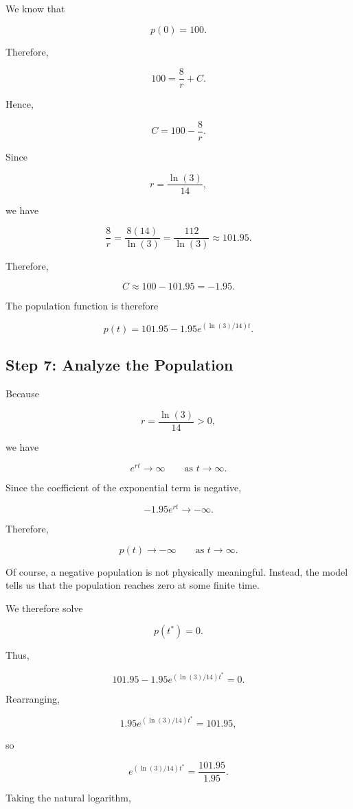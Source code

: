 \documentclass[11pt]{article}
\begin{document}
We know that

\[
p(0)=100.
\]

Therefore,

\[
100
=
\frac{8}{r}+C.
\]

Hence,

\[
C
=
100-\frac{8}{r}.
\]

Since

\[
r=\frac{\ln(3)}{14},
\]

we have

\[
\frac{8}{r}
=
\frac{8(14)}{\ln(3)}
=
\frac{112}{\ln(3)}
\approx 101.95.
\]

Therefore,

\[
C
\approx
100-101.95
=
-1.95.
\]

The population function is therefore

\[
\boxed{
p(t)
=
101.95
-
1.95e^{(\ln(3)/14)t}.
}
\]

\subsection{Step 7: Analyze the Population}

Because

\[
r=\frac{\ln(3)}{14}>0,
\]

we have

\[
e^{rt}\to\infty
\qquad\text{as }t\to\infty.
\]

Since the coefficient of the exponential term is negative,

\[
-1.95e^{rt}\to-\infty.
\]

Therefore,

\[
\boxed{
p(t)\to-\infty
\qquad\text{as }t\to\infty.
}
\]

Of course, a negative population is not physically meaningful.
Instead, the model tells us that the population reaches zero at
some finite time.

We therefore solve

\[
p(t^*)=0.
\]

Thus,

\[
101.95-1.95e^{(\ln(3)/14)t^*}=0.
\]

Rearranging,

\[
1.95e^{(\ln(3)/14)t^*}=101.95,
\]

so

\[
e^{(\ln(3)/14)t^*}
=
\frac{101.95}{1.95}.
\]

Taking the natural logarithm,
\end{document}
